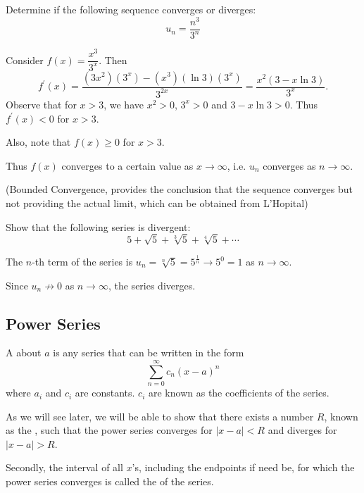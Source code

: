 \begin{exercise}
Determine if the following sequence converges or diverges:
\[ u_n=\frac{n^3}{3^n} \]
\end{exercise}

\begin{solution}
Consider $f(x)=\dfrac{x^3}{3^x}$. Then
\[ f^\prime(x)=\frac{(3x^2)(3^x)-(x^3)(\ln3)(3^x)}{3^{2x}}=\frac{x^2(3-x\ln3)}{3^x}. \]
Observe that for $x>3$, we have $x^2>0$, $3^x>0$ and $3-x\ln3>0$. Thus $f^\prime(x)<0$ for $x>3$.

Also, note that $f(x)\ge0$ for $x>3$. 

Thus $f(x)$ converges to a certain value as $x\to\infty$, i.e. $u_n$ converges as $n\to\infty$.

(Bounded Convergence, provides the conclusion that the sequence converges but not providing the actual limit, which can be obtained from L'Hopital)
\end{solution}

\begin{exercise}
Show that the following series is divergent:
\[ 5+\sqrt{5}+\sqrt[3]{5}+\sqrt[4]{5}+\cdots \]
\end{exercise}

\begin{solution}
The $n$-th term of the series is $u_n=\sqrt[n]{5}=5^\frac{1}{n}\to5^0=1$ as $n\to\infty$.

Since $u_n\not\to0$ as $n\to\infty$, the series diverges.
\end{solution}

\subsection{Power Series}
\begin{definition}
A  about $a$ is any series that can be written in the form
\[ \sum_{n=0}^\infty c_n(x-a)^n \]
where $a_i$ and $c_i$ are constants. $c_i$ are known as the coefficients of the series.
\end{definition}

As we will see later, we will be able to show that there exists a number $R$, known as the , such that the power series converges for $|x-a|<R$ and diverges for $|x-a|>R$.

Secondly, the interval of all $x$'s, including the endpoints if need be, for which the power series converges is called the  of the series.


